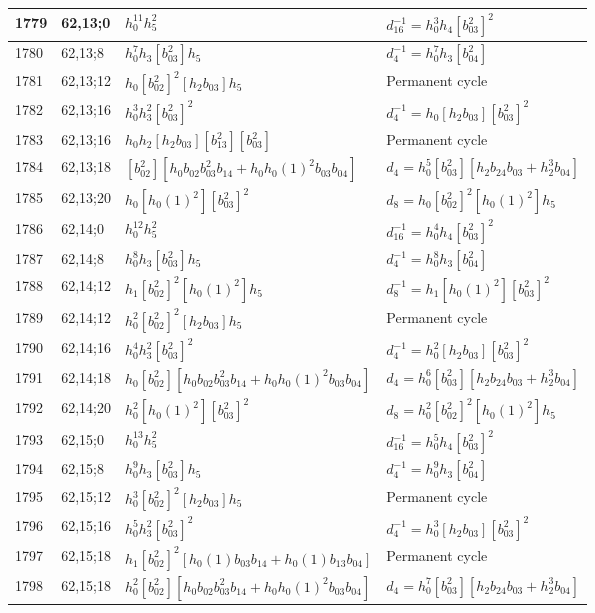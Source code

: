 \documentclass{article}
\begin{document}
\begin{longtable}{|l|l|>{\raggedright\arraybackslash}p{6cm}|>{\raggedright\arraybackslash}p{6cm}|}
\hline
1779 & 62,13;0 & $h_0^{11}h_5^2$ & $d_{16}^{-1}=h_0^3h_4[b_{03}^2]^2$\\
\hline
1780 & 62,13;8 & $h_0^7h_3[b_{03}^2]h_5$ & $d_{4}^{-1}=h_0^7h_3[b_{04}^2]$\\
\hline
1781 & 62,13;12 & $h_0[b_{02}^2]^2[h_2b_{03}]h_5$ & Permanent cycle\\
\hline
1782 & 62,13;16 & $h_0^3h_3^2[b_{03}^2]^2$ & $d_{4}^{-1}=h_0[h_2b_{03}][b_{03}^2]^2$\\
1783 & 62,13;16 & $h_0h_2[h_2b_{03}][b_{13}^2][b_{03}^2]$ & Permanent cycle\\
\hline
1784 & 62,13;18 & $[b_{02}^2][h_0b_{02}b_{03}^2b_{14} + h_0h_0(1)^2b_{03}b_{04}]$ &$d_{4}=h_0^5[b_{03}^2][h_2b_{24}b_{03} + h_2^3b_{04}]$\\
\hline
1785 & 62,13;20 & $h_0[h_0(1)^2][b_{03}^2]^2$ &$d_{8}=h_0[b_{02}^2]^2[h_0(1)^2]h_5$\\
\hline
1786 & 62,14;0 & $h_0^{12}h_5^2$ & $d_{16}^{-1}=h_0^4h_4[b_{03}^2]^2$\\
\hline
1787 & 62,14;8 & $h_0^8h_3[b_{03}^2]h_5$ & $d_{4}^{-1}=h_0^8h_3[b_{04}^2]$\\
\hline
1788 & 62,14;12 & $h_1[b_{02}^2]^2[h_0(1)^2]h_5$ & $d_{8}^{-1}=h_1[h_0(1)^2][b_{03}^2]^2$\\
1789 & 62,14;12 & $h_0^2[b_{02}^2]^2[h_2b_{03}]h_5$ & Permanent cycle\\
\hline
1790 & 62,14;16 & $h_0^4h_3^2[b_{03}^2]^2$ & $d_{4}^{-1}=h_0^2[h_2b_{03}][b_{03}^2]^2$\\
\hline
1791 & 62,14;18 & $h_0[b_{02}^2][h_0b_{02}b_{03}^2b_{14} + h_0h_0(1)^2b_{03}b_{04}]$ &$d_{4}=h_0^6[b_{03}^2][h_2b_{24}b_{03} + h_2^3b_{04}]$\\
\hline
1792 & 62,14;20 & $h_0^2[h_0(1)^2][b_{03}^2]^2$ &$d_{8}=h_0^2[b_{02}^2]^2[h_0(1)^2]h_5$\\
\hline
1793 & 62,15;0 & $h_0^{13}h_5^2$ & $d_{16}^{-1}=h_0^5h_4[b_{03}^2]^2$\\
\hline
1794 & 62,15;8 & $h_0^9h_3[b_{03}^2]h_5$ & $d_{4}^{-1}=h_0^9h_3[b_{04}^2]$\\
\hline
1795 & 62,15;12 & $h_0^3[b_{02}^2]^2[h_2b_{03}]h_5$ & Permanent cycle\\
\hline
1796 & 62,15;16 & $h_0^5h_3^2[b_{03}^2]^2$ & $d_{4}^{-1}=h_0^3[h_2b_{03}][b_{03}^2]^2$\\
\hline
1797 & 62,15;18 & $h_1[b_{02}^2]^2[h_0(1)b_{03}b_{14} + h_0(1)b_{13}b_{04}]$ & Permanent cycle\\
1798 & 62,15;18 & $h_0^2[b_{02}^2][h_0b_{02}b_{03}^2b_{14} + h_0h_0(1)^2b_{03}b_{04}]$ &$d_{4}=h_0^7[b_{03}^2][h_2b_{24}b_{03} + h_2^3b_{04}]$\\

\end{longtable}
\end{document}
